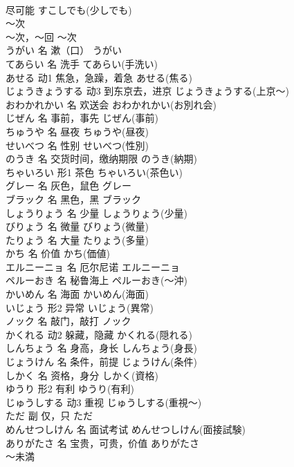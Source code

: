\documentclass[8pt]{extreport}
\begin{document}
\begin{CJK}{UTF8}{min}
\\	尽可能	すこしでも(少しでも)	
\\	～次	
\\	～次，～回	～次	
\\	うがい	名	漱（口）	うがい	
\\	てあらい	名	洗手	てあらい(手洗い)	
\\	あせる	动1	焦急，急躁，着急	あせる(焦る)	
\\	じょうきょうする	动3	到东京去，进京	じょうきょうする(上京～)	
\\	おわかれかい	名	欢送会	おわかれかい(お別れ会)	
\\	じぜん	名	事前，事先	じぜん(事前)	
\\	ちゅうや	名	昼夜	ちゅうや(昼夜)	
\\	せいべつ	名	性别	せいべつ(性別)	
\\	のうき	名	交货时间，缴纳期限	のうき(納期)	
\\	ちゃいろい	形1	茶色	ちゃいろい(茶色い)	
\\	グレー	名	灰色，鼠色	グレー	
\\	ブラック	名	黑色，黑	ブラック	
\\	しょうりょう	名	少量	しょうりょう(少量)	
\\	びりょう	名	微量	びりょう(微量)	
\\	たりょう	名	大量	たりょう(多量)	
\\	かち	名	价值	かち(価値)	
\\	エルニーニョ	名	厄尔尼诺	エルニーニョ	
\\	ペルーおき	名	秘鲁海上	ペルーおき(～沖)	
\\	かいめん	名	海面	かいめん(海面)	
\\	いじょう	形2	异常	いじょう(異常)	
\\	ノック	名	敲门，敲打	ノック	
\\	かくれる	动2	躲藏，隐藏	かくれる(隠れる)	
\\	しんちょう	名	身高，身长	しんちょう(身長)	
\\	じょうけん	名	条件，前提	じょうけん(条件)	
\\	しかく	名	资格，身分	しかく(資格)	
\\	ゆうり	形2	有利	ゆうり(有利)	
\\	じゅうしする	动3	重视	じゅうしする(重視～)	
\\	ただ	副	仅，只	ただ	
\\	めんせつしけん	名	面试考试	めんせつしけん(面接試験)	
\\	ありがたさ	名	宝贵，可贵，价值	ありがたさ	
\\	～未満	

\end{CJK}
\end{document}
